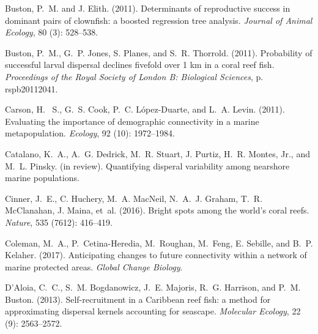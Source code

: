 \documentclass[12pt, oneside]{article}   	%
\begin{document}
\begin{thebibliography}{66}
Buston, P.~M. and J. Elith. (2011).
\newblock Determinants of reproductive success in dominant pairs of clownfish:
  a boosted regression tree analysis.
\newblock \emph{Journal of Animal Ecology}, 80 (3): 528--538.

Buston, P.~M., G.~P. Jones, S. Planes, and S.~R. Thorrold. (2011).
\newblock Probability of successful larval dispersal declines fivefold over 1
  km in a coral reef fish.
\newblock \emph{Proceedings of the Royal Society of London B: Biological
  Sciences}, p. rspb20112041.

Carson, H.~ S., G.~S. Cook, P.~C. L{\'o}pez-Duarte, and L.~A. Levin. (2011).
\newblock Evaluating the importance of demographic connectivity in a marine
  metapopulation.
\newblock \emph{Ecology}, 92 (10): 1972--1984.

Catalano, K.~A., A.~G. Dedrick, M.~R. Stuart, J. Purtiz,
  H.~R. Montes, Jr., and M.~L. Pinsky. (in review).
\newblock Quantifying disperal variability among nearshore marine populations.

Cinner, J.~E., C. Huchery, M.~A. MacNeil, N.~A.~J. Graham, T.~R.
  McClanahan, J. Maina, et~al. (2016).
\newblock Bright spots among the world’s coral reefs.
\newblock \emph{Nature}, 535 (7612): 416--419.

Coleman, M.~A., P.~Cetina-Heredia, M.~Roughan, M.~Feng, E. Sebille, and B.~P. Kelaher. (2017).
\newblock Anticipating changes to future connectivity within a network of
  marine protected areas.
\newblock \emph{Global Change Biology}.

D'Aloia, C.~C., S.~M. Bogdanowicz, J.~E. Majoris, R.~G. Harrison, and P.~M.
  Buston. (2013).
\newblock Self-recruitment in a Caribbean reef fish: a method for
  approximating dispersal kernels accounting for seascape.
\newblock \emph{Molecular Ecology}, 22 (9): 2563--2572.


\end{thebibliography}
\end{document}
